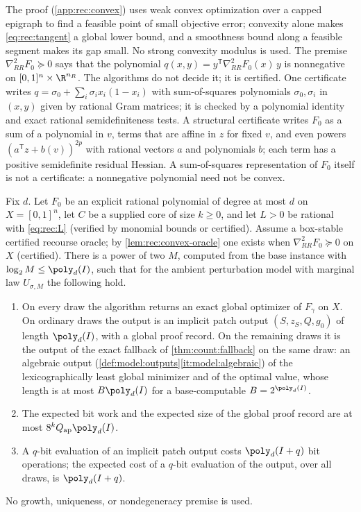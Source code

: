 The proof (\cref{app:rec:convex}) uses weak convex optimization over a capped
epigraph \citep[Definition~2.1.10 and Corollary~4.2.7]{grotschel1988-geometric-algorithms-and-combinatorial-optimization}
to find a feasible point of small objective error; convexity alone makes
\eqref{eq:rec:tangent} a global lower bound, and a smoothness bound along a
feasible segment makes its gap small. No strong convexity modulus is used.
The premise $\nabla^2_{RR}F_0\succeq0$ says that the polynomial
$q(x,y)=y^{\mathsf T}\nabla^2_{RR}F_0(x)\,y$ is nonnegative on
$[0,1]^n\times\R^{n_R}$. The algorithms do not decide it; it is certified.
One certificate writes $q=\sigma_0+\sum_i\sigma_ix_i(1-x_i)$ with
sum-of-squares polynomials $\sigma_0,\sigma_i$ in $(x,y)$ given by rational
Gram matrices; it is checked by a polynomial identity and exact rational
semidefiniteness tests. A structural certificate writes $F_0$ as a sum of a
polynomial in $v$, terms that are affine in $z$ for fixed $v$, and even
powers $(a^{\mathsf T}z+b(v))^{2p}$ with rational vectors $a$ and polynomials
$b$; each term has a positive semidefinite residual Hessian. A
sum-of-squares representation of $F_0$ itself is not a certificate: a
nonnegative polynomial need not be convex.

\begin{theorem}\label{thm:rec:poly}
Fix $d$. Let $F_0$ be an explicit rational polynomial of degree at most $d$
on $X=[0,1]^n$, let $C$ be a supplied core of size $k\ge0$, and let $L>0$ be
rational with \eqref{eq:rec:L} (verified by monomial bounds or certified).
Assume a box-stable certified recourse oracle; by
\cref{lem:rec:convex-oracle} one exists when $\nabla^2_{RR}F_0\succeq0$ on
$X$ (certified). There is a power of two $M$, computed from the base
instance with $\log_2M\le\poly_d(I)$, such that for the ambient perturbation
model with marginal law $U_{\sigma,M}$ the following hold.
\begin{enumerate}[label=(\roman*)]
\item On every draw the algorithm returns an exact global optimizer of
$F_\gamma$ on $X$. On ordinary draws the output is an implicit patch output
$(S,z_S,Q,g_0)$ of length $\poly_d(I)$, with a global proof record. On the
remaining draws it is the output of the exact fallback of
\cref{thm:count:fallback} on the same draw: an algebraic output
(\cref{def:model:outputs}\ref{it:model:algebraic}) of the lexicographically
least global minimizer and of the optimal value, whose length is at most
$B\poly_d(I)$ for a base-computable $B=2^{\poly_d(I)}$.
\item The expected bit work and the expected size of the global proof
record are at most $8^kQ_{\rm ap}\poly_d(I)$.
\item A $q$-bit evaluation of an implicit patch output costs
$\poly_d(I+q)$ bit operations; the expected cost of a $q$-bit evaluation of
the output, over all draws, is $\poly_d(I+q)$.
\end{enumerate}
No growth, uniqueness, or nondegeneracy premise is used.
\end{theorem}

